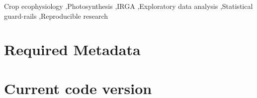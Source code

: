 \documentclass[preprint,12pt,a4paper]{elsarticle}
\begin{document}
\begin{frontmatter}
\begin{abstract}
Field ecophysiology campaigns based on infrared gas analyzers (IRGA), chlorophyll meters and ceptometers produce tabular datasets of gas-exchange, chlorophyll-fluorescence and leaf-area variables that must be cleaned, explored, modelled and mapped before publication. Instrument vendors provide no free open-source software for these stages, forcing researchers to write ad hoc scripts. We present \emph{PhysioFlow}, an open-source Python/Streamlit interactive platform that ingests CSV/XLSX exports, validates them against an explicit schema, and exposes a configurable replicate-handling pipeline, exploratory analysis with statistical guard-rails (categorical confounding via Cram\'er's V, VIF with derived-variable awareness, Kruskal--Wallis with minimum-N filtering, normality tests with companion Q--Q plots, multi-method outlier consensus), predictive modelling with optional GroupKFold, geospatial analysis in UTM metres and STL time-series decomposition with sparsity guard-rails, in a single code-free trilingual (PT/EN/ES) interface. Released under GPL-2.0 with a mandatory citation clause, it is used in the Goi\'as Verde initiative.
\end{abstract}

\begin{keyword}
Crop ecophysiology \sep Photosynthesis \sep IRGA \sep Exploratory data analysis \sep Statistical guard-rails \sep Reproducible research
\end{keyword}

\end{frontmatter}

\section*{Required Metadata}

\section*{Current code version}
\end{document}
